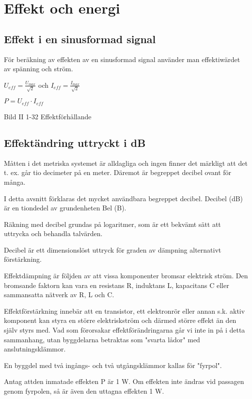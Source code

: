 \cleardoublepage

\section{Effekt och energi}

\subsection{Effekt i en sinusformad signal}
För beräkning av effekten av en sinusformad signal använder man effektiwärdet
av spänning och ström.

$U_{eff} = \frac{U_{max}}{\sqrt{2}}$ och $I_{eff} = \frac{I_{max}}{\sqrt{2}}$

$P = U_{eff} \cdot I_{eff}$

Bild II 1-32 Effektförhållande

\subsection{Effektändring uttryckt i dB}
Måtten i det metriska systemet är alldagliga och ingen finner det märkligt att
det t. ex. går tio decimeter på en meter. Däremot är begreppet decibel ovant för
många.

I detta avsnitt förklaras det mycket användbara begreppet decibel. Decibel (dB)
är en tiondedel av grundenheten Bel (B).

Räkning med decibel grundas på logaritmer, som är ett bekvämt sätt att uttrycka
och behandla talvärden.

Decibel är ett dimensionslöst uttryck för graden av dämpning alternativt
förstärkning.

Effektdämpning är följden av att vissa komponenter bromsar elektrisk ström. Den
bromsande faktorn kan vara en resistans R, induktans L, kapacitans C eller
sammansatta nätverk av R, L och C.

Effektförstärkning innebär att en transistor, ett elektronrör eller annan s.k.
aktiv komponent kan styra en större elektriskström och därmed större effekt än
den själv styrs med. Vad som förorsakar effektförändringarna går vi inte in på i
detta sammanhang, utan byggdelarna betraktas som "svarta lådor" med
anslutningsklämmor.

En byggdel med två ingångs- och två utgångsklämmor kallas för "fyrpol".

Antag attden inmatade effekten P är 1 W. Om effekten inte ändras vid passagen
genom fyrpolen, så är även den uttagna effekten 1 W.

